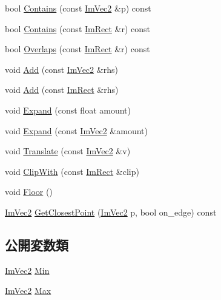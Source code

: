 \begin{DoxyCompactItemize}
\item 
bool \mbox{\hyperlink{struct_im_rect_ac583156fd0e9306181fff5d120b262ea}{Contains}} (const \mbox{\hyperlink{struct_im_vec2}{Im\+Vec2}} \&p) const
\item 
bool \mbox{\hyperlink{struct_im_rect_ad6043344d8ac30d5f342c71641cfe24b}{Contains}} (const \mbox{\hyperlink{struct_im_rect}{Im\+Rect}} \&r) const
\item 
bool \mbox{\hyperlink{struct_im_rect_a0af3bade3781e5e7c6afdf71ccfb0d43}{Overlaps}} (const \mbox{\hyperlink{struct_im_rect}{Im\+Rect}} \&r) const
\item 
void \mbox{\hyperlink{struct_im_rect_a9d6cbef8c86ca01a16bb0fd35b457f88}{Add}} (const \mbox{\hyperlink{struct_im_vec2}{Im\+Vec2}} \&rhs)
\item 
void \mbox{\hyperlink{struct_im_rect_a9bcb65fd17843c74555291a522e9ebdf}{Add}} (const \mbox{\hyperlink{struct_im_rect}{Im\+Rect}} \&rhs)
\item 
void \mbox{\hyperlink{struct_im_rect_af33a7424c3341d08acd69da30c27c753}{Expand}} (const float amount)
\item 
void \mbox{\hyperlink{struct_im_rect_ac0b0b88fe65725b4694cd7d91d42d382}{Expand}} (const \mbox{\hyperlink{struct_im_vec2}{Im\+Vec2}} \&amount)
\item 
void \mbox{\hyperlink{struct_im_rect_ae964217d0317002b1ae80f935c97e689}{Translate}} (const \mbox{\hyperlink{struct_im_vec2}{Im\+Vec2}} \&v)
\item 
void \mbox{\hyperlink{struct_im_rect_a5e220ababe2fa079638aab8f4b0b8ace}{Clip\+With}} (const \mbox{\hyperlink{struct_im_rect}{Im\+Rect}} \&clip)
\item 
void \mbox{\hyperlink{struct_im_rect_a8fdf75a0c64ff29f65113cd9f8be77ab}{Floor}} ()
\item 
\mbox{\hyperlink{struct_im_vec2}{Im\+Vec2}} \mbox{\hyperlink{struct_im_rect_a223c67d4c93e5c87a33a68ebb527bbb8}{Get\+Closest\+Point}} (\mbox{\hyperlink{struct_im_vec2}{Im\+Vec2}} p, bool on\+\_\+edge) const
\end{DoxyCompactItemize}
\subsection*{公開変数類}
\begin{DoxyCompactItemize}
\item 
\mbox{\hyperlink{struct_im_vec2}{Im\+Vec2}} \mbox{\hyperlink{struct_im_rect_af8f3fbf7ec983e03548b88e14ba68aa8}{Min}}
\item 
\mbox{\hyperlink{struct_im_vec2}{Im\+Vec2}} \mbox{\hyperlink{struct_im_rect_aad58c13340d320b350a72a037e3f7628}{Max}}
\end{DoxyCompactItemize}


